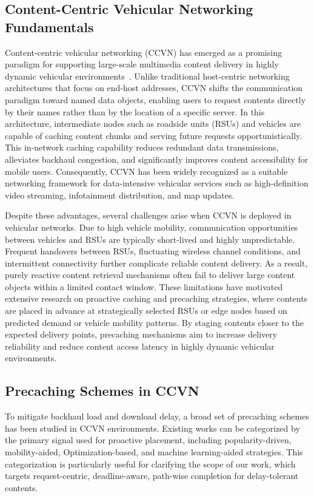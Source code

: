 \subsection{Content-Centric Vehicular Networking Fundamentals}
\label{subsec:rw_ccvn}

Content-centric vehicular networking (CCVN) has emerged as a promising paradigm for supporting large-scale multimedia content delivery in highly dynamic vehicular environments~\cite{CCVN}. 
Unlike traditional host-centric networking architectures that focus on end-host addresses, CCVN shifts the communication paradigm toward named data objects, enabling users to request contents directly by their names rather than by the location of a specific server. 
In this architecture, intermediate nodes such as roadside units (RSUs) and vehicles are capable of caching content chunks and serving future requests opportunistically. 
This in-network caching capability reduces redundant data transmissions, alleviates backhaul congestion, and significantly improves content accessibility for mobile users. 
Consequently, CCVN has been widely recognized as a suitable networking framework for data-intensive vehicular services such as high-definition video streaming, infotainment distribution, and map updates.

Despite these advantages, several challenges arise when CCVN is deployed in vehicular networks. 
Due to high vehicle mobility, communication opportunities between vehicles and RSUs are typically short-lived and highly unpredictable. 
Frequent handovers between RSUs, fluctuating wireless channel conditions, and intermittent connectivity further complicate reliable content delivery. 
As a result, purely reactive content retrieval mechanisms often fail to deliver large content objects within a limited contact window. 
These limitations have motivated extensive research on proactive caching and precaching strategies, where contents are placed in advance at strategically selected RSUs or edge nodes based on predicted demand or vehicle mobility patterns. 
By staging contents closer to the expected delivery points, precaching mechanisms aim to increase delivery reliability and reduce content access latency in highly dynamic vehicular environments.

\subsection{Precaching Schemes in CCVN}
\label{subsec:rw_precaching}
To mitigate backhaul load and download delay, a broad set of precaching schemes has been studied in CCVN environments. 
Existing works can be categorized by the primary signal used for proactive placement, including popularity-driven, mobility-aided, Optimization-based, and machine learning-aided strategies. 
This categorization is particularly useful for clarifying the scope of our work, which targets request-centric, deadline-aware, path-wise completion for delay-tolerant contents.

